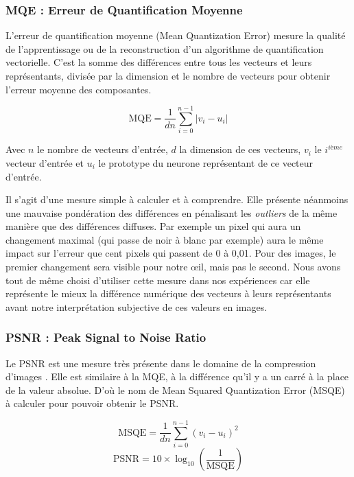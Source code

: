	\subsubsection{MQE : Erreur de Quantification Moyenne}

	L'erreur de quantification moyenne (Mean Quantization Error) mesure la qualité de l'apprentissage ou de la reconstruction d'un algorithme de quantification vectorielle. C'est la somme des différences entre tous les vecteurs et leurs représentants, divisée par la dimension et le nombre de vecteurs pour obtenir l'erreur moyenne des composantes.
	
	\begin{equation}
		\text{MQE} = \frac{1}{dn} \sum_{i=0}^{n-1} |v_i - u_i|
	\end{equation}

	Avec $n$ le nombre de vecteurs d'entrée, $d$ la dimension de ces vecteurs, $v_i$ le $i^{\textit{ième}}$ vecteur d'entrée et $u_i$ le prototype du neurone représentant de ce vecteur d'entrée. 

	Il s'agit d'une mesure simple à calculer et à comprendre. Elle présente néanmoins une mauvaise pondération des différences en pénalisant les \textit{outliers} de la même manière que des différences diffuses. Par exemple un pixel qui aura un changement maximal (qui passe de noir à blanc par exemple) aura le même impact sur l'erreur que cent pixels qui passent de 0 à 0,01. Pour des images, le premier changement sera visible pour notre œil, mais pas le second. Nous avons tout de même choisi d'utiliser cette mesure dans nos expériences car elle représente le mieux la différence numérique des vecteurs à leurs représentants avant notre interprétation subjective de ces valeurs en images.

	\subsubsection{PSNR : Peak Signal to Noise Ratio}

	Le PSNR est une mesure très présente dans le domaine de la compression d'images \cite{huynh-psnr, korhonen-psnr}. Elle est similaire à la MQE, à la différence qu'il y a un carré à la place de la valeur absolue. D'où le nom de Mean Squared Quantization Error (MSQE) à calculer pour pouvoir obtenir le PSNR.
	
	\begin{equation}
		\text{MSQE} = \frac{1}{dn} \sum_{i=0}^{n-1} (v_i - u_i)^2
	\end{equation}
	\begin{equation}
		\text{PSNR} = 10 \times \log_{10} \left( \frac{1}{\text{MSQE}} \right)
	\end{equation}

